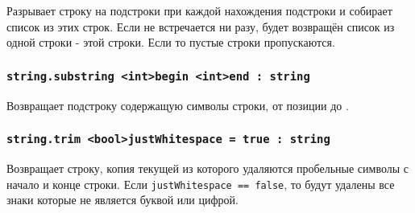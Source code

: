 Разрывает строку на подстроки при каждой нахождения подстроки  и собирает список из этих строк. Если  не встречается ни разу, будет возвращён список из одной строки - этой строки. Если  то пустые строки пропускаются.

\subsubsection{\lstinline|string.substring <int>begin <int>end : string|}

Возвращает подстроку содержащую символы строки, от позиции  до .

\subsubsection{\lstinline|string.trim <bool>justWhitespace = true : string|}

Возвращает строку, копия текущей из которого удаляются пробельные символы с начало и конце строки. Если \lstinline|justWhitespace == false|, то будут удалены все знаки которые не является буквой или цифрой.


